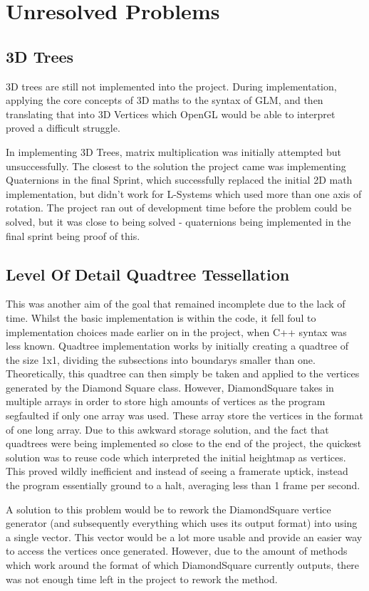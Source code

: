 \documentclass[a4paper,10pt]{report}
\begin{document}
\section{Unresolved Problems}
\subsection{3D Trees}
3D trees are still not implemented into the project. During implementation, applying the core concepts of 3D maths to the syntax of GLM, and then translating that into 3D Vertices which OpenGL would be able to interpret proved a difficult struggle. \medskip

In implementing 3D Trees, matrix multiplication was initially attempted but unsuccessfully. The closest to the solution the project came was implementing Quaternions in the final Sprint, which successfully replaced the initial 2D math implementation, but didn't work for L-Systems which used more than one axis of rotation. The project ran out of development time before the problem could be solved, but it was close to being solved - quaternions being implemented in the final sprint being proof of this.

\subsection{Level Of Detail Quadtree Tessellation}
This was another aim of the goal that remained incomplete due to the lack of time. Whilst the basic implementation is within the code, it fell foul to implementation choices made earlier on in the project, when C++ syntax was less known. Quadtree implementation works by initially creating a quadtree of the size 1x1, dividing the subsections into boundarys smaller than one. Theoretically, this quadtree can then simply be taken and applied to the vertices generated by the Diamond Square class. However, DiamondSquare takes in multiple arrays in order to store high amounts of vertices as the program segfaulted if only one array was used. These array store the vertices in the format of one long array. Due to this awkward storage solution, and the fact that quadtrees were being implemented so close to the end of the project, the quickest solution was to reuse code which interpreted the initial heightmap as vertices. This proved wildly inefficient and instead of seeing a framerate uptick, instead the program essentially ground to a halt, averaging less than 1 frame per second. \medskip

A solution to this problem would be to rework the DiamondSquare vertice generator (and subsequently everything which uses its output format) into using a single vector. This vector would be a lot more usable and provide an easier way to access the vertices once generated. However, due to the amount of methods which work around the format of which DiamondSquare currently outputs, there was not enough time left in the project to rework the method. \medskip
\end{document}
